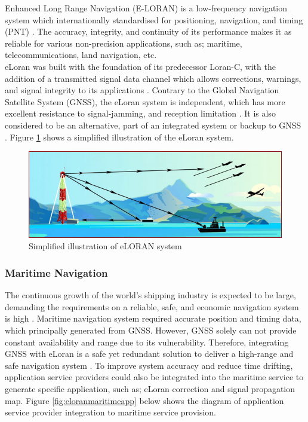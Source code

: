 Enhanced Long Range Navigation (E-LORAN) is a low-frequency navigation system which internationally standardised for positioning, navigation, and timing (PNT) \cite{EnhancedApril}\cite{InternationalLORANAssociation2007EnhancedApril}. The accuracy, integrity, and continuity of its performance makes it as reliable for various non-precision applications, such as; maritime, telecommunications, land navigation, etc. \\

\noindent eLoran was built with the foundation of its predecessor Loran-C, with the addition of a transmitted signal data channel which allows corrections, warnings, and signal integrity to its applications \cite{EnhancedApril}. Contrary to the Global Navigation Satellite System (GNSS), the eLoran system is independent, which has more excellent resistance to signal-jamming, and reception limitation \cite{Anonymous2009LORANELORAN}. It is also considered to be an alternative, part of an integrated system or backup to GNSS \cite{Son2020ELoran:Areas}. Figure \ref{fig:ELORAN_Ill} shows a simplified illustration of the eLoran system.

\begin{figure}[!ht]
    \centering
    \includegraphics[scale = 0.5]{Figures/ELORAN_Ilustration.jpg}
    \caption{Simplified illustration of eLORAN system \cite{Anonymous2009LORANELORAN}}
    \label{fig:ELORAN_Ill}
\end{figure}
%
\subsubsection{Maritime Navigation}
The continuous growth of the world's shipping industry is expected to be large, demanding the requirements on a reliable, safe, and economic navigation system is high \cite{2004TheVision}. Maritime navigation system required accurate position and timing data, which principally generated from GNSS. However, GNSS solely can not provide constant availability and range due to its vulnerability. Therefore, integrating GNSS with eLoran is a safe yet redundant solution to deliver a high-range and safe navigation system \cite{InternationalLORANAssociation2007EnhancedApril}. To improve system accuracy and reduce time drifting, application service providers could also be integrated into the maritime service to generate specific application, such as; eLoran correction and signal propagation map. Figure \ref{fig:eloranmaritimeapp} below shows the diagram of application service provider integration to maritime service provision.\\

